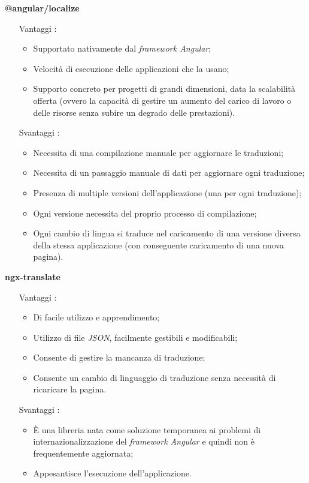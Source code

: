 \vspace{0.5cm}
\textbf{@angular/localize}
\begin{itemize}
    \item [Vantaggi]:
        \begin{itemize}
            \item Supportato nativamente dal \textit{framework Angular};
            \item Velocità di esecuzione delle applicazioni che la usano;
            \item Supporto concreto per progetti di grandi dimensioni, data la scalabilità offerta (ovvero la capacità di gestire un aumento del carico di lavoro o delle risorse senza subire un degrado delle prestazioni).
        \end{itemize}
    \item [Svantaggi]:
        \begin{itemize}
            \item Necessita di una compilazione manuale per aggiornare le traduzioni;
            \item Necessita di un passaggio manuale di dati per aggiornare ogni traduzione;
            \item Presenza di multiple versioni dell’applicazione (una per ogni traduzione);
            \item Ogni versione necessita del proprio processo di compilazione;
            \item Ogni cambio di lingua si traduce nel caricamento di una versione diversa della stessa applicazione (con conseguente caricamento di una nuova pagina).
        \end{itemize}
\end{itemize}

\vspace{0.5cm}
\textbf{ngx-translate}
\begin{itemize}
    \item [Vantaggi]:
        \begin{itemize}
            \item Di facile utilizzo e apprendimento;
            \item Utilizzo di file \textit{JSON}, facilmente gestibili e modificabili;
            \item Consente di gestire la mancanza di traduzione;
            \item Consente un cambio di linguaggio di traduzione senza necessità di ricaricare la pagina.
        \end{itemize}
    \item [Svantaggi]:
        \begin{itemize}
            \item È una libreria nata come soluzione temporanea ai problemi di internazionalizzazione del \textit{framework Angular} e quindi non è frequentemente aggiornata;
            \item Appesantisce l’esecuzione dell’applicazione.
        \end{itemize}
\end{itemize}

